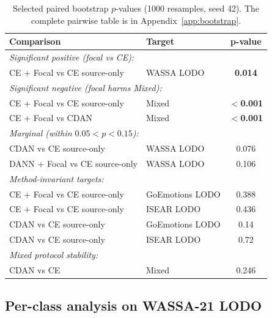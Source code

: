 \begin{table}[t]
\centering
\small
\begin{tabular}{llc}
\toprule
\textbf{Comparison} & \textbf{Target} & \textbf{p-value} \\
\midrule
\multicolumn{3}{l}{\emph{Significant positive (focal vs CE):}} \\
CE + Focal vs CE source-only & WASSA LODO & \textbf{0.014} \\
\midrule
\multicolumn{3}{l}{\emph{Significant negative (focal harms Mixed):}} \\
CE + Focal vs CE source-only & Mixed & \textbf{$<$0.001} \\
CE + Focal vs CDAN          & Mixed & \textbf{$<$0.001} \\
\midrule
\multicolumn{3}{l}{\emph{Marginal (within $0.05 < p < 0.15$):}} \\
CDAN vs CE source-only      & WASSA LODO & 0.076 \\
DANN + Focal vs CE source-only & WASSA LODO & 0.106 \\
\midrule
\multicolumn{3}{l}{\emph{Method-invariant targets:}} \\
CE + Focal vs CE source-only & GoEmotions LODO & 0.388 \\
CE + Focal vs CE source-only & ISEAR LODO & 0.436 \\
CDAN vs CE source-only      & GoEmotions LODO & 0.14 \\
CDAN vs CE source-only      & ISEAR LODO & 0.72 \\
\midrule
\multicolumn{3}{l}{\emph{Mixed protocol stability:}} \\
CDAN vs CE                   & Mixed & 0.246 \\
\bottomrule
\end{tabular}
\caption{Selected paired bootstrap $p$-values (1000 resamples, seed
42). The complete pairwise table is in
Appendix~\ref{app:bootstrap}.}
\label{tab:bootstrap}
\end{table}

\subsection{Per-class analysis on WASSA-21 LODO}
\label{sec:results:perclass}

